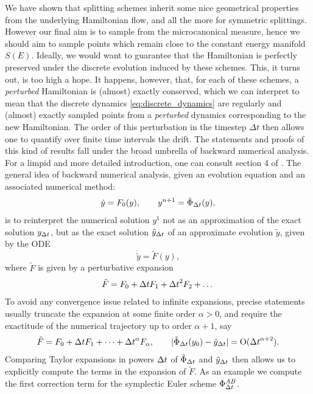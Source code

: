     We have shown that splitting schemes inherit some nice geometrical properties from the underlying Hamiltonian flow, and all the more for symmetric splittings.
    However our final aim is to sample from the microcanonical measure, hence we should aim to sample points which remain close to the constant energy manifold $S(E)$.
    Ideally, we would want to guarantee that the Hamiltonian is perfectly preserved under the discrete evolution induced by these schemes. This, it turns out, is too high a hope.
    It happens, however, that, for each of these schemes, a \textit{perturbed} Hamiltonian is (almost) exactly conserved, which we can interpret to mean that the discrete dynamics \eqref{eq:discrete_dynamics} are regularly  and (almost) exactly sampled points from a \textit{perturbed} dynamics corresponding to the new Hamiltonian.
    The order of this perturbation in the timestep $\Delta t$ then allows one to quantify over finite time intervals the drift. The statements and proofs of this kind of results fall under the broad umbrella of backward numerical analysis. For a limpid and more detailed introduction, one can consult section 4 of \cite{HLG03}.
    The general idea of backward numerical analysis, given an evolution equation and an associated numerical method:
    \[\dot y = F_0(y),\qquad y^{n+1} = \tilde\Phi_{{\Delta t}}(y),\]
    is to reinterpret the numerical solution $y^1$ not as an approximation of the exact solution $y_{{\Delta t}}$, but as the exact solution $\tilde y_{{\Delta t}}$ of an approximate evolution $\tilde y$, given by the ODE
    \[\dot{\tilde y}=\tilde F(y),\]
    where $\tilde F$ is given by a perturbative expansion
    \[\tilde F=F_0 + {\Delta t} F_1 + {\Delta t}^2 F_2 +\dots\]
    To avoid any convergence issue related to infinite expansions, precise statements usually truncate the expansion at some finite order $\alpha>0$, and require the exactitude of the numerical trajectory up to order $\alpha+1$, say
    \[\tilde F=F_0 + {\Delta t} F_1 + \dots + {\Delta t}^\alpha F_\alpha,\qquad |\tilde \Phi_{\Delta t}(y_0) - \tilde y_{\Delta t}|= \mathrm{O}({\Delta t}^{\alpha+2}).\]
    Comparing Taylor expansions in powers ${\Delta t}$ of $\tilde\Phi_{\Delta t}$ and $\tilde y_{{\Delta t}}$ then allows us to explicitly compute the terms in the expansion of $\tilde F$.
    As an example we compute the first correction term for the symplectic Euler scheme $\Phi_{{\Delta t}}^{AB}$.
